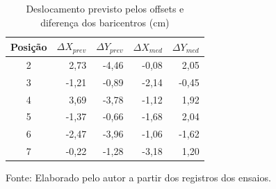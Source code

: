 \begin{table}[H]\centering
\caption{Deslocamento previsto pelos offsets e diferença dos baricentros (cm)}\label{tab:reanalise-offsets}
\small\begin{tabular}{crrrr}\toprule
Posição & $\Delta X_{prev}$ & $\Delta Y_{prev}$ & $\Delta X_{med}$ & $\Delta Y_{med}$\\\midrule
2 & 2,73 & -4,46 & -0,08 & 2,05\\
3 & -1,21 & -0,89 & -2,14 & -0,45\\
4 & 3,69 & -3,78 & -1,12 & 1,92\\
5 & -1,37 & -0,66 & -1,68 & 2,04\\
6 & -2,47 & -3,96 & -1,06 & -1,62\\
7 & -0,22 & -1,28 & -3,18 & 1,20\\
\bottomrule\end{tabular}\par\smallskip
{\footnotesize Fonte: Elaborado pelo autor a partir dos registros dos ensaios.}\end{table}
